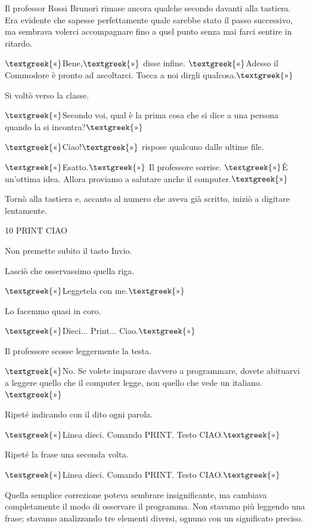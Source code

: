 \documentclass{article}
\begin{document}
Il professor Rossi Brunori rimase ancora qualche secondo davanti alla tastiera. Era evidente che sapesse perfettamente
quale sarebbe stato il passo successivo, ma sembrava volerci accompagnare fino a quel punto senza mai farci sentire in
ritardo.

$\text{\textgreek{«}}$Bene,$\text{\textgreek{»}}$ disse infine. $\text{\textgreek{«}}$Adesso il Commodore è pronto ad
ascoltarci. Tocca a noi dirgli qualcosa.$\text{\textgreek{»}}$

Si voltò verso la classe.

$\text{\textgreek{«}}$Secondo voi, qual è la prima cosa che si dice a una persona quando la si
incontra?$\text{\textgreek{»}}$

$\text{\textgreek{«}}$Ciao!$\text{\textgreek{»}}$ rispose qualcuno dalle ultime file.

$\text{\textgreek{«}}$Esatto.$\text{\textgreek{»}}$ Il professore sorrise. $\text{\textgreek{«}}$È un'ottima idea.
Allora proviamo a salutare anche il computer.$\text{\textgreek{»}}$

Tornò alla tastiera e, accanto al numero che aveva già scritto, iniziò a digitare lentamente.

10 PRINT {\textquotedbl}CIAO{\textquotedbl}

Non premette subito il tasto Invio.

Lasciò che osservassimo quella riga.

$\text{\textgreek{«}}$Leggetela con me.$\text{\textgreek{»}}$

Lo facemmo quasi in coro.

$\text{\textgreek{«}}$Dieci... Print... Ciao.$\text{\textgreek{»}}$

Il professore scosse leggermente la testa.

$\text{\textgreek{«}}$No. Se volete imparare davvero a programmare, dovete abituarvi a leggere quello che il computer
legge, non quello che vede un italiano.$\text{\textgreek{»}}$

Ripeté indicando con il dito ogni parola.

$\text{\textgreek{«}}$Linea dieci. Comando PRINT. Testo CIAO.$\text{\textgreek{»}}$

Ripeté la frase una seconda volta.

$\text{\textgreek{«}}$Linea dieci. Comando PRINT. Testo CIAO.$\text{\textgreek{»}}$

Quella semplice correzione poteva sembrare insignificante, ma cambiava completamente il modo di osservare il programma.
Non stavamo più leggendo una frase; stavamo analizzando tre elementi diversi, ognuno con un significato preciso.
\end{document}
